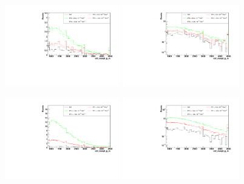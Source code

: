 \begin{figure}[h]
  \begin{center}
	\includegraphics[width=0.45\textwidth]{Plots/aQGC_kinematics/vbf_maxpt_jj_m_FT0.pdf}%
	\includegraphics[width=0.45\textwidth]{Plots/aQGC_kinematics/vbf_maxpt_jj_m_FT0_log.pdf}\\
    \caption{}
  \end{center}
\end{figure}
\begin{figure}[h]
  \begin{center}
	\includegraphics[width=0.45\textwidth]{Plots/aQGC_kinematics/vbf_maxpt_jj_m_FT1.pdf}%
	\includegraphics[width=0.45\textwidth]{Plots/aQGC_kinematics/vbf_maxpt_jj_m_FT1_log.pdf}\\
    \caption{}
  \end{center}
\end{figure}
